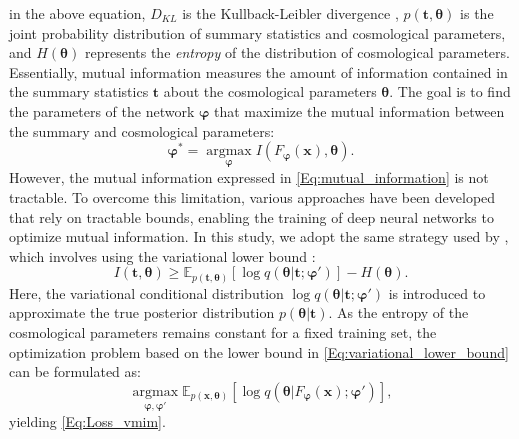 \documentclass{aa}
\begin{document}
in the above equation, $D_{KL}$ is the Kullback-Leibler divergence \citep{kullback1951information}, $p(\bm {t}, \bm {\theta})$ is the joint probability distribution of summary statistics and cosmological parameters, and $H(\bm {\theta})$ represents the \textit{entropy} of the distribution of cosmological parameters.  
Essentially, mutual information measures the amount of information contained in the summary statistics $\bm t$ about the cosmological parameters $\bm \theta$.
The goal is to find the parameters of the network $\bm {\varphi}$ that maximize the mutual information between the summary and cosmological parameters:
\begin{equation}
   \bm {\varphi}^*= \operatorname*{argmax}_{\bm {\varphi}} I(F_{\bm {\varphi}}(\bm{x}), \bm {\theta}).
\end{equation}
However, the mutual information expressed in \autoref{Eq:mutual_information} is not tractable. To overcome this limitation, various approaches have been developed that rely on tractable bounds, enabling the training of deep neural networks to optimize mutual information. In this study, we adopt the same strategy used by \citet{jeffrey2021likelihood}, which involves using the variational lower bound \citep{barber2003information}:
\begin{equation}\label{Eq:variational_lower_bound}
    I(\bm{t}, \bm{\theta}) \ge \mathbb{E}_{p(\bm {t}, \bm {\theta})} [\log{q(\bm {\theta} |\bm{t} ; \bm{\varphi}')}]- H(\bm {\theta}).
\end{equation}
Here, the variational conditional distribution $\log{q(\bm {\theta} |\bm{t}; \bm{\varphi}')}$ is introduced to approximate the true posterior distribution $p(\bm{\theta}|\bm {t})$. 
As the entropy of the cosmological parameters remains constant for a fixed training set, the optimization problem based on the lower bound in \autoref{Eq:variational_lower_bound} can be formulated as:
\begin{equation}
    \operatorname*{argmax}_{\bm {\varphi}, \bm {\varphi}'}\mathbb{E}_{p(\bm {x}, \bm {\theta})} [\log{q(\bm {\theta} |F_{\bm {\varphi}}(\bm {x}) ; \bm{\varphi}')}], 
\end{equation}
yielding \autoref{Eq:Loss_vmim}.
\end{document}
